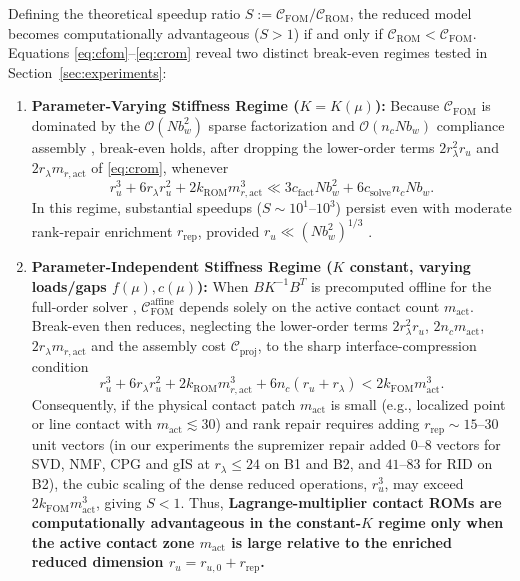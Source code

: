 \documentclass[11pt,a4paper]{article}
\providecommand{\tightlist}{\setlength{\itemsep}{0pt}\setlength{\parskip}{0pt}}
\begin{document}
Defining the theoretical speedup ratio \(S := \mathcal{C}_{\text{FOM}} / \mathcal{C}_{\text{ROM}}\), the reduced model becomes computationally advantageous (\(S > 1\)) if and only if \(\mathcal{C}_{\text{ROM}} < \mathcal{C}_{\text{FOM}}\). Equations \eqref{eq:cfom}--\eqref{eq:crom} reveal two distinct break-even regimes tested in Section~\ref{sec:experiments}:

\begin{enumerate}
\def\labelenumi{\arabic{enumi}.}
\tightlist
\item
  \textbf{Parameter-Varying Stiffness Regime (\(K = K(\mu)\)):}
  Because \(\mathcal{C}_{\text{FOM}}\) is dominated by the \(\mathcal{O}(N b_w^2)\) sparse factorization and \(\mathcal{O}(n_c N b_w)\) compliance assembly \cite{franceschini2022block}, break-even holds, after dropping the lower-order terms \(2 r_\lambda^2 r_u\) and \(2 r_\lambda m_{r,\text{act}}\) of \eqref{eq:crom}, whenever
  \begin{equation}\label{eq:be-var}r_u^3 + 6 r_\lambda r_u^2 + 2 k_{\text{ROM}} m_{r,\text{act}}^3 \ll 3 c_{\text{fact}} N b_w^2 + 6 c_{\text{solve}} n_c N b_w.\end{equation}
  In this regime, substantial speedups (\(S \sim 10^1\text{--}10^3\)) persist even with moderate rank-repair enrichment \(r_{\text{rep}}\), provided \(r_u \ll (N b_w^2)^{1/3}\) \cite{koller2021hyper, pawar2025efficient}.
\item
  \textbf{Parameter-Independent Stiffness Regime (\(K\) constant, varying loads/gaps \(f(\mu), c(\mu)\)):}
  When \(B K^{-1} B^T\) is precomputed offline for the full-order solver \cite{pawar2025efficient}, \(\mathcal{C}_{\text{FOM}}^{\text{affine}}\) depends solely on the active contact count \(m_{\text{act}}\). Break-even then reduces, neglecting the lower-order terms \(2 r_\lambda^2 r_u\), \(2 n_c m_{\text{act}}\), \(2 r_\lambda m_{r,\text{act}}\) and the assembly cost \(\mathcal{C}_{\text{proj}}\), to the sharp interface-compression condition
  \begin{equation}\label{eq:be-aff}r_u^3 + 6 r_\lambda r_u^2 + 2 k_{\text{ROM}} m_{r,\text{act}}^3 + 6 n_c (r_u + r_\lambda) < 2 k_{\text{FOM}} m_{\text{act}}^3.\end{equation}
  Consequently, if the physical contact patch \(m_{\text{act}}\) is small (e.g., localized point or line contact with \(m_{\text{act}} \lesssim 30\)) and rank repair requires adding \(r_{\text{rep}} \sim 15\text{--}30\) unit vectors (in our experiments the supremizer repair added \(0\)--\(8\) vectors for SVD, NMF, CPG and gIS at \(r_\lambda \le 24\) on B1 and B2, and \(41\)--\(83\) for RID on B2), the cubic scaling of the dense reduced operations, \(r_u^3\), may exceed \(2 k_{\text{FOM}} m_{\text{act}}^3\), giving \(S < 1\). Thus, \textbf{Lagrange-multiplier contact ROMs are computationally advantageous in the constant-\(K\) regime only when the active contact zone \(m_{\text{act}}\) is large relative to the enriched reduced dimension \(r_u = r_{u,0} + r_{\text{rep}}\).}
\end{enumerate}
\end{document}
